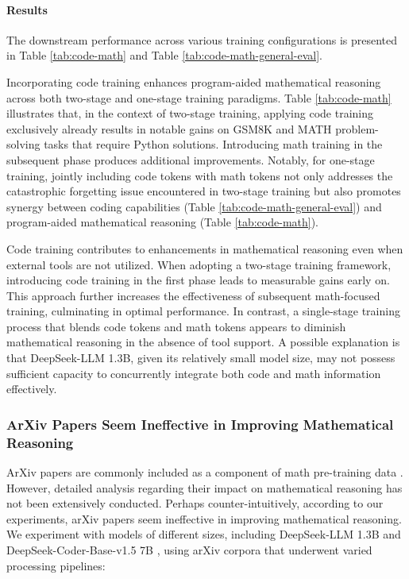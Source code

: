 \begin{itemize}[topsep=0pt]
\begin{itemize}[topsep=0pt]
\paragraph{Results}
The downstream performance across various training configurations is presented in Table \ref{tab:code-math} and Table \ref{tab:code-math-general-eval}.

Incorporating code training enhances program-aided mathematical reasoning across both two-stage and one-stage training paradigms. Table \ref{tab:code-math} illustrates that, in the context of two-stage training, applying code training exclusively already results in notable gains on GSM8K and MATH problem-solving tasks that require Python solutions. Introducing math training in the subsequent phase produces additional improvements. Notably, for one-stage training, jointly including code tokens with math tokens not only addresses the catastrophic forgetting issue encountered in two-stage training but also promotes synergy between coding capabilities (Table \ref{tab:code-math-general-eval}) and program-aided mathematical reasoning (Table \ref{tab:code-math}).

Code training contributes to enhancements in mathematical reasoning even when external tools are not utilized. When adopting a two-stage training framework, introducing code training in the first phase leads to measurable gains early on. This approach further increases the effectiveness of subsequent math-focused training, culminating in optimal performance. In contrast, a single-stage training process that blends code tokens and math tokens appears to diminish mathematical reasoning in the absence of tool support. A possible explanation is that DeepSeek-LLM 1.3B, given its relatively small model size, may not possess sufficient capacity to concurrently integrate both code and math information effectively.

\subsubsection{ArXiv Papers Seem Ineffective in Improving Mathematical Reasoning}

ArXiv papers are commonly included as a component of math pre-training data \citep{minerva,gpt-f,llemma,mathpile}. However, detailed analysis regarding their impact on mathematical reasoning has not been extensively conducted. Perhaps counter-intuitively, according to our experiments, arXiv papers seem ineffective in improving mathematical reasoning. We experiment with models of different sizes, including DeepSeek-LLM 1.3B and DeepSeek-Coder-Base-v1.5 7B \citep{deepseek-coder}, using arXiv corpora that underwent varied processing pipelines:


\end{itemize}
\end{itemize}
